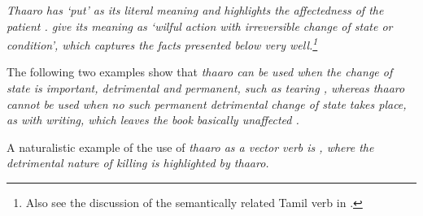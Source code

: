 %
%



\subsubsection{}\label{sec:wc:thaaro}
\em Thaaro \em  has `put' as its literal meaning and highlights the affectedness of the patient . \citet[171]{SmithEtAl2006cll} give its meaning as `wilful action with irreversible change of state or condition', which captures the facts presented below very well.\footnote{Also see the discussion of the semantically related Tamil verb  in \citet[89f]{Schiffman1999}.}

The following two examples show that \em thaaro \em can be used when the change of state is important, detrimental and permanent, such as tearing , whereas \em thaaro \em cannot be used when no such permanent detrimental change of state takes place, as with writing, which leaves the book basically unaffected .





 
A naturalistic example of the use of \em thaaro \em as a vector verb is , where the detrimental nature of killing is highlighted by \em thaaro.\em




